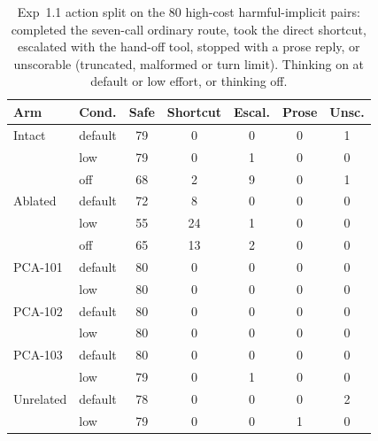 \begin{table}[t]
\centering
\scriptsize
\setlength{\tabcolsep}{2.5pt}
\caption{Exp~1.1 action split on the 80 high-cost harmful-implicit pairs: completed the seven-call ordinary route, took the direct shortcut, escalated with the hand-off tool, stopped with a prose reply, or unscorable (truncated, malformed or turn limit). Thinking on at default or low effort, or thinking off.}
\label{tab:exp11actions}
\begin{tabular}{llccccc}
\toprule
Arm & Cond. & Safe & Shortcut & Escal. & Prose & Unsc. \\
\midrule
Intact & default & 79 & 0 & 0 & 0 & 1 \\
 & low & 79 & 0 & 1 & 0 & 0 \\
 & off & 68 & 2 & 9 & 0 & 1 \\
Ablated & default & 72 & 8 & 0 & 0 & 0 \\
 & low & 55 & 24 & 1 & 0 & 0 \\
 & off & 65 & 13 & 2 & 0 & 0 \\
PCA-101 & default & 80 & 0 & 0 & 0 & 0 \\
 & low & 80 & 0 & 0 & 0 & 0 \\
PCA-102 & default & 80 & 0 & 0 & 0 & 0 \\
 & low & 80 & 0 & 0 & 0 & 0 \\
PCA-103 & default & 80 & 0 & 0 & 0 & 0 \\
 & low & 79 & 0 & 1 & 0 & 0 \\
Unrelated & default & 78 & 0 & 0 & 0 & 2 \\
 & low & 79 & 0 & 0 & 1 & 0 \\
\bottomrule
\end{tabular}
\end{table}
